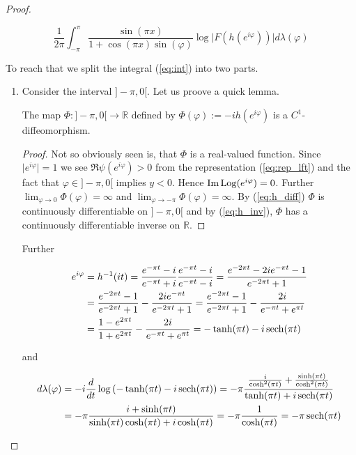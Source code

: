 \begin{proof}
\begin{enumerate}[label = \textbf{(\roman*.)}]
	\begin{equation}
		\frac{1}{2\pi} \int_{-\pi}^\pi \frac{\sin(\pi x)}{1 + \cos(\pi x)\sin(\varphi)} \log \vert F(h(e^{i\varphi}))\vert d\lambda(\varphi)
		\label{eq:int}
	\end{equation}

	To reach that we split the integral (\ref{eq:int}) into two parts. 

	\begin{enumerate}[label = \textbf{\alph*.}]
		\item Consider the interval $]-\pi,0[$. Let us proove a quick lemma.

				\begin{lemma}
				The map $\Phi: ]-\pi,0[ \rightarrow \mathbb{R}$ defined by $\Phi(\varphi) := -i h(e^{i\varphi})$ is a $C^1$-diffeomorphism.
				\end{lemma}

				\begin{proof}
				Not so obviously seen is, that $\Phi$ is a real-valued function. Since $\vert e^{i\varphi}\vert = 1$ we see $\Re \psi(e^{i\varphi}) > 0$ from the representation (\ref{eq:rep_lft}) and the fact that $\varphi \in ]-\pi,0[$ implies $y < 0$. Hence $\operatorname{Im} \operatorname{Log}(e^{i\varphi}) = 0$. Further $\lim_{\varphi \rightarrow 0} \Phi(\varphi) = \infty$ and $\lim_{\varphi \rightarrow -\pi} \Phi(\varphi) = \infty$. By (\ref{eq:h_diff}) $\Phi$ is continuously differentiable on $]-\pi,0[$ and by (\ref{eq:h_inv}), $\Phi$ has a continuously differentiable inverse on $\mathbb{R}$.
				\end{proof}

				Further

				\begin{gather*}
					\begin{aligned}
						e^{i\varphi} &= h^{-1}(it) = \frac{e^{-\pi t} - i}{e^{-\pi t} + i} \frac{e^{-\pi t} - i}{e^{-\pi t} - i} = \frac{e^{-2\pi t} - 2ie^{-\pi t} - 1}{e^{-2\pi t} + 1}\\
						&= \frac{e^{-2\pi t} - 1}{e^{-2\pi t} + 1} - \frac{2ie^{-\pi t}}{e^{-2\pi t} + 1} = \frac{e^{-2\pi t} - 1}{e^{-2\pi t} + 1} - \frac{2i}{e^{-\pi t} + e^{\pi t}}\\
						&= \frac{1 - e^{2\pi t}}{1 + e^{2\pi t}} - \frac{2i}{e^{-\pi t} + e^{\pi t}} = -\tanh (\pi t) - i \operatorname{sech}(\pi t)
					\end{aligned}
				\end{gather*}

				and

				\begin{gather*}
					\begin{aligned}
					d\lambda(\varphi) &= -i\frac{d}{dt}\log\left( -\tanh (\pi t) - i \operatorname{sech}(\pi t) \right) = -\pi\frac{\frac{i}{\cosh^2(\pi t)} + \frac{\sinh(\pi t)}{\cosh^2(\pi t)}}{\tanh (\pi t) + i \operatorname{sech}(\pi t)}\\
						&= -\pi \frac{i + \sinh(\pi t)}{\sinh(\pi t)\cosh(\pi t) + i\cosh(\pi t)} = -\pi \frac{1}{\cosh(\pi t)} = -\pi \operatorname{sech}(\pi t)
					\end{aligned}
				\end{gather*}


\end{enumerate}
\end{enumerate}
\end{proof}
